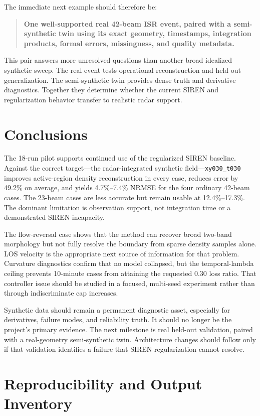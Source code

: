 \documentclass[11pt]{article}
\newcommand{\targetreg}{\texttt{xy030\_t030}}
\begin{document}
The immediate next example should therefore be:
\begin{quote}
\textbf{One well-supported real 42-beam ISR event, paired with a semi-synthetic twin using its exact geometry,
timestamps, integration products, formal errors, missingness, and quality metadata.}
\end{quote}

This pair answers more unresolved questions than another broad idealized synthetic sweep. The real event
tests operational reconstruction and held-out generalization. The semi-synthetic twin provides dense truth
and derivative diagnostics. Together they determine whether the current SIREN and regularization behavior
transfer to realistic radar support.

\section{Conclusions}

The 18-run pilot supports continued use of the regularized SIREN baseline. Against the correct target---the
radar-integrated synthetic field---\targetreg{} improves active-region density reconstruction in every case,
reduces error by 49.2\% on average, and yields 4.7\%--7.4\% NRMSE for the four ordinary 42-beam cases. The
23-beam cases are less accurate but remain usable at 12.4\%--17.3\%. The dominant limitation is observation
support, not integration time or a demonstrated SIREN incapacity.

The flow-reversal case shows that the method can recover broad two-band morphology but not fully resolve the
boundary from sparse density samples alone. LOS velocity is the appropriate next source of information for
that problem. Curvature diagnostics confirm that no model collapsed, but the temporal-lambda ceiling prevents
10-minute cases from attaining the requested 0.30 loss ratio. That controller issue should be studied in a
focused, multi-seed experiment rather than through indiscriminate cap increases.

Synthetic data should remain a permanent diagnostic asset, especially for derivatives, failure modes, and
reliability truth. It should no longer be the project's primary evidence. The next milestone is real held-out
validation, paired with a real-geometry semi-synthetic twin. Architecture changes should follow only if that
validation identifies a failure that SIREN regularization cannot resolve.

\appendix

\section{Reproducibility and Output Inventory}
\end{document}

